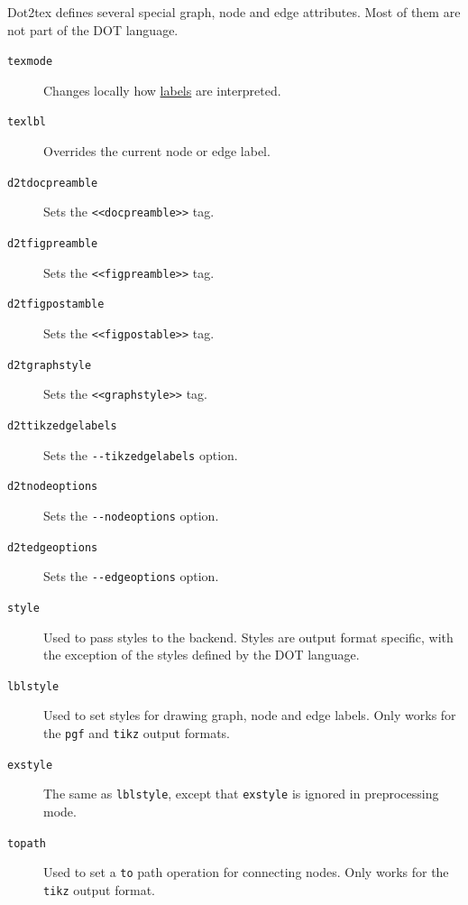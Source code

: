 \documentclass[10pt,a4paper,english]{article}
\begin{document}
Dot2tex defines several special graph, node and edge attributes. Most of them are not part of the DOT language.
\begin{description}
\item[{\texttt{texmode}}] \leavevmode 
Changes locally how \href{\#labels}{labels} are interpreted.

\item[{\texttt{texlbl}}] \leavevmode 
Overrides the current node or edge label.

\item[{\texttt{d2tdocpreamble}}] \leavevmode 
Sets the \texttt{<{}<docpreamble>{}>} tag.

\item[{\texttt{d2tfigpreamble}}] \leavevmode 
Sets the \texttt{<{}<figpreamble>{}>} tag.

\item[{\texttt{d2tfigpostamble}}] \leavevmode 
Sets the \texttt{<{}<figpostable>{}>} tag.

\item[{\texttt{d2tgraphstyle}}] \leavevmode 
Sets the \texttt{<{}<graphstyle>{}>} tag.

\item[{\texttt{d2ttikzedgelabels}}] \leavevmode 
Sets the \texttt{-{}-tikzedgelabels} option.

\item[{\texttt{d2tnodeoptions}}] \leavevmode 
Sets the \texttt{-{}-nodeoptions} option.

\item[{\texttt{d2tedgeoptions}}] \leavevmode 
Sets the \texttt{-{}-edgeoptions} option.

\item[{\texttt{style}}] \leavevmode 
Used to pass styles to the backend. Styles are output format specific, with the exception of the styles defined by the DOT language.

\item[{\texttt{lblstyle}}] \leavevmode 
Used to set styles for drawing graph, node and edge labels. Only works for the \texttt{pgf} and \texttt{tikz} output formats.

\item[{\texttt{exstyle}}] \leavevmode 
The same as \texttt{lblstyle}, except that \texttt{exstyle} is ignored in preprocessing mode.

\item[{\texttt{topath}}] \leavevmode 
Used to set a \texttt{to} path operation for connecting nodes. Only works for the \texttt{tikz} output format.


\end{description}
\end{document}
